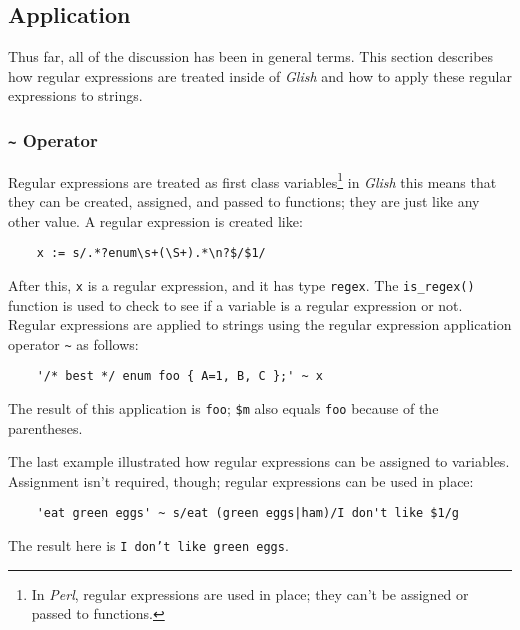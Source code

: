 \subsection{Application}
\label{match-variable}

Thus far, all of the discussion has been in general terms. This section
describes how regular expressions are treated inside of
{\em Glish} and how to apply these regular expressions to strings.

\subsubsection{{\large\tt \~{}} Operator}

Regular expressions are treated as first class variables\footnote{In
{\em Perl}, regular expressions are used in place; they can't be assigned
or passed to functions.} in {\em Glish} this means that they can be
created, assigned, and passed to functions; they are just like any other
value. A regular expression is created like:
\begin{verbatim}
    x := s/.*?enum\s+(\S+).*\n?$/$1/
\end{verbatim}
After this, {\tt x} is a regular expression, and it has type {\tt regex}.
\label{is_regex-func} The {\tt is\_regex()} function
is used to check to see if a variable is a regular expression or not.
Regular expressions are applied to strings using the regular expression
application operator \verb+~+ as follows:
\begin{verbatim}
    '/* best */ enum foo { A=1, B, C };' ~ x
\end{verbatim}
The result of this application is {\tt foo}; \verb+$m+ also equals {\tt foo}
because of the parentheses.

The last example illustrated how regular expressions can be assigned to
variables. Assignment isn't required, though; regular expressions can
be used in place:
\begin{verbatim}
    'eat green eggs' ~ s/eat (green eggs|ham)/I don't like $1/g
\end{verbatim}
The result here is {\tt I don't like green eggs}.

